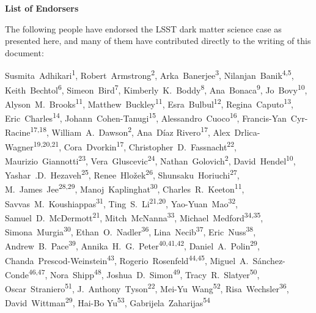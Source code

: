 
\begin{center}
  {\Large \bf List of Endorsers}
\end{center}
\bigskip

The following people have endorsed the LSST dark matter science case as presented here, and many of them have contributed directly to the writing of this document:

\def\altaffilmark#1{\textsuperscript{#1}}
\def\affil#1{\noindent #1 \\}

\normalsize
\begin{raggedright}

Susmita~Adhikari\altaffilmark{1},
Robert~Armstrong\altaffilmark{2},
Arka~Banerjee\altaffilmark{3},
Nilanjan~Banik\altaffilmark{4,5},
Keith~Bechtol\altaffilmark{6},
Simeon~Bird\altaffilmark{7},
Kimberly~K.~Boddy\altaffilmark{8},
Ana~Bonaca\altaffilmark{9},
Jo~Bovy\altaffilmark{10},
Alyson~M.~Brooks\altaffilmark{11},
Matthew~Buckley\altaffilmark{11},
Esra~Bulbul\altaffilmark{12},
Regina~Caputo\altaffilmark{13},
Eric~Charles\altaffilmark{14},
Johann~Cohen-Tanugi\altaffilmark{15},
Alessandro~Cuoco\altaffilmark{16},
Francis-Yan~Cyr-Racine\altaffilmark{17,18},
William~A.~Dawson\altaffilmark{2},
Ana~D\'{i}az Rivero\altaffilmark{17},
Alex~Drlica-Wagner\altaffilmark{19,20,21},
Cora~Dvorkin\altaffilmark{17},
Christopher~D.~Fassnacht\altaffilmark{22},
Maurizio~Giannotti\altaffilmark{23},
Vera~Gluscevic\altaffilmark{24},
Nathan~Golovich\altaffilmark{2},
David~Hendel\altaffilmark{10},
Yashar~.D.~Hezaveh\altaffilmark{25},
Renee~Hlo\v{z}ek\altaffilmark{26},
Shunsaku~Horiuchi\altaffilmark{27},
M.~James~Jee\altaffilmark{28,29},
Manoj~Kaplinghat\altaffilmark{30},
Charles~R.~Keeton\altaffilmark{11},
Savvas~M.~Koushiappas\altaffilmark{31},
Ting~S.~Li\altaffilmark{21,20},
Yao-Yuan~Mao\altaffilmark{32},
Samuel~D.~McDermott\altaffilmark{21},
Mitch~McNanna\altaffilmark{33},
Michael~Medford\altaffilmark{34,35},
Simona~Murgia\altaffilmark{30},
Ethan~O.~Nadler\altaffilmark{36},
Lina~Necib\altaffilmark{37},
Eric~Nuss\altaffilmark{38},
Andrew~B.~Pace\altaffilmark{39},
Annika~H.~G.~Peter\altaffilmark{40,41,42},
Daniel~A.~Polin\altaffilmark{29},
Chanda~Prescod-Weinstein\altaffilmark{43},
Rogerio~Rosenfeld\altaffilmark{44,45},
Miguel~A.~S\'anchez-Conde\altaffilmark{46,47},
Nora~Shipp\altaffilmark{48},
Joshua~D.~Simon\altaffilmark{49},
Tracy~R.~Slatyer\altaffilmark{50},
Oscar~Straniero\altaffilmark{51},
J.~Anthony~Tyson\altaffilmark{22},
Mei-Yu~Wang\altaffilmark{52},
Risa~Wechsler\altaffilmark{36},
David~Wittman\altaffilmark{29},
Hai-Bo Yu\altaffilmark{53},
Gabrijela~Zaharijas\altaffilmark{54}


\end{raggedright}
